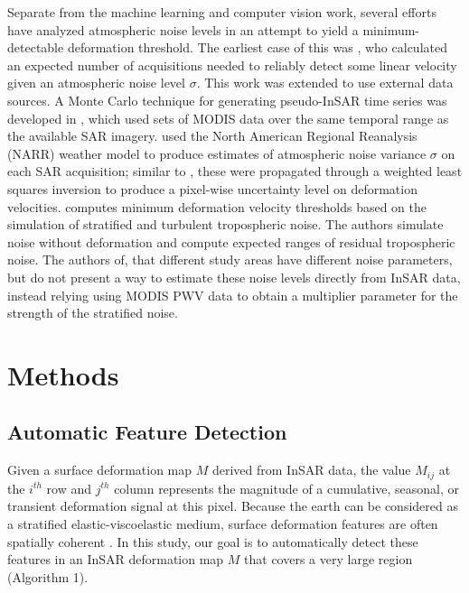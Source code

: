 Separate from the machine learning and computer vision work, several efforts have analyzed atmospheric noise levels in an attempt to yield a minimum-detectable deformation threshold.
The earliest case of this was \cite{Emardson2003NeutralAtmosphericDelay}, who calculated an expected number of acquisitions needed to reliably detect some linear velocity given an atmospheric noise level $\sigma$. This work was extended to use external data sources.
A Monte Carlo technique for generating pseudo-InSAR time series was developed in \cite{Barnhart2013CharacterizingEstimatingNoise}, which used sets of MODIS data over the same temporal range as the available SAR imagery.
\cite{Parker2015SystematicAssessmentAtmospheric} used the North American Regional Reanalysis (NARR) weather model to produce estimates of atmospheric noise variance $\sigma$ on each SAR acquisition; similar to \cite{Emardson2003NeutralAtmosphericDelay}, these were propagated through a weighted least squares inversion to produce a pixel-wise uncertainty level on deformation velocities. \cite{Havazli2021DetectionThresholdEstimates} computes minimum deformation velocity thresholds based on the simulation of stratified and turbulent tropospheric noise. The authors simulate noise without deformation and compute expected ranges of residual tropospheric noise. The authors of, \cite{Havazli2021DetectionThresholdEstimates} that different study areas have different noise parameters, but do not present a way to estimate these noise levels directly from InSAR data, instead relying using MODIS PWV data to obtain a multiplier parameter for the strength of the stratified noise.





\section{Methods}
\label{sec:methods}


\subsection{Automatic Feature Detection}
\label{subsec:methods-1-log}

Given a surface deformation map $M$ derived from InSAR data, the value $ M_{ij} $ at the $i^{th}$ row and $j^{th}$ column represents the magnitude of a cumulative, seasonal, or transient deformation signal at this pixel. Because the earth can be considered as a stratified elastic-viscoelastic medium, surface deformation features are often spatially coherent \cite{Segall2010EarthquakeVolcanoDeformation}. In this study, our goal is to automatically detect these features in an InSAR deformation map $M$ that covers a very large region (Algorithm 1).

